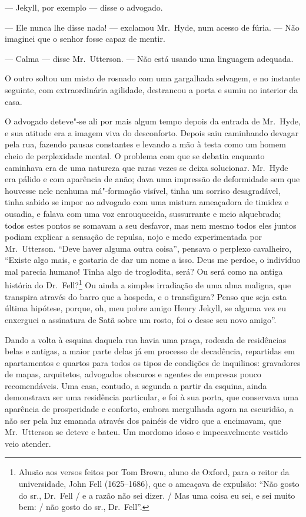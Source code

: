 --- Jekyll, por exemplo --- disse o advogado.

--- Ele nunca lhe disse nada! --- exclamou Mr.~Hyde, num acesso de fúria.
--- Não imaginei que o senhor fosse capaz de mentir.

--- Calma --- disse Mr.~Utterson. --- Não está usando uma linguagem
adequada.

O outro soltou um misto de rosnado com uma gargalhada selvagem, e no
instante seguinte, com extraordinária agilidade, destrancou a porta e
sumiu no interior da casa.

O advogado deteve"-se ali por mais algum tempo depois da entrada de Mr.~Hyde, 
e sua atitude era a imagem viva do desconforto.  Depois saiu
caminhando devagar pela rua, fazendo pausas constantes e levando a mão à
testa como um homem cheio de perplexidade mental.  O problema com que
se debatia enquanto caminhava era de uma natureza que raras vezes se
deixa solucionar.  Mr.~Hyde era pálido e com aparência de anão; dava
uma impressão de deformidade sem que houvesse nele nenhuma má"-formação
visível, tinha um sorriso desagradável, tinha sabido se impor ao
advogado com uma mistura ameaçadora de timidez e ousadia, e falava com
uma voz enrouquecida, sussurrante e meio alquebrada; todos estes pontos
se somavam a seu desfavor, mas nem mesmo todos eles juntos podiam
explicar a sensação de repulsa, nojo e medo experimentada por Mr.~Utterson.  
“Deve haver alguma outra coisa”, pensava o perplexo
cavalheiro, “Existe algo mais, e gostaria de dar um nome a isso.  Deus
me perdoe, o indivíduo mal parecia humano!  Tinha algo de troglodita,
será?  Ou será como na antiga história do Dr.~Fell?\footnote{
Alusão aos versos feitos por Tom Brown, aluno de Oxford, para o reitor
da universidade, John Fell (1625--1686), que o ameaçava de expulsão:
“Não gosto do sr., Dr.~Fell / e a razão não sei dizer. / Mas uma coisa
eu sei, e sei muito bem: / não gosto do sr., Dr.~Fell”.} 
Ou ainda a simples irradiação de uma alma maligna, que transpira
através do barro que a hospeda, e o transfigura?  Penso que seja esta
última hipótese, porque, oh, meu pobre amigo Henry Jekyll, se alguma
vez eu enxerguei a assinatura de Satã sobre um rosto, foi o desse seu
novo amigo”.

Dando a volta à esquina daquela rua havia uma praça, rodeada de
residências belas e antigas, a maior parte delas já em processo de
decadência, repartidas em apartamentos e quartos para todos os tipos de
condições de inquilinos: gravadores de mapas, arquitetos, advogados
obscuros e agentes de empresas pouco recomendáveis.  Uma casa, contudo,
a segunda a partir da esquina, ainda demonstrava ser uma residência
particular, e foi à sua porta, que conservava uma aparência de
prosperidade e conforto, embora mergulhada agora na escuridão, a não
ser pela luz emanada através dos painéis de vidro que a encimavam, que
Mr.~Utterson se deteve e bateu.  Um mordomo idoso e impecavelmente
vestido veio atender.

